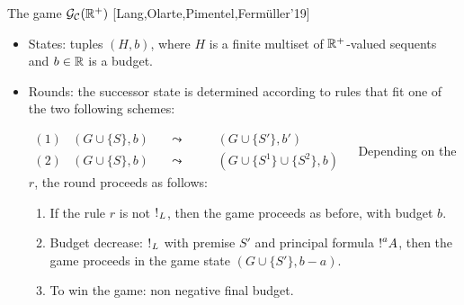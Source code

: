 \documentclass[9pt]{beamer}
\renewcommand{\emph}[1]{{\color{blue} #1}}
\newcommand{\emphdo}[1]{{\color{darkorange} #1}}
\begin{document}
\begin{frame}{The game $\mathcal{G}_{\mathcal{C}}(\mathbb{R}^+)$ [Lang,Olarte,Pimentel,Ferm\"{u}ller'19]}
\begin{itemize}
\item \emph{States}:  tuples $(H,b)$, where $H$ is a finite multiset of $\mathbb{R}^+$-valued sequents and $b\in\mathbb{R}$ is a \emphdo{budget}.
\item \emph{Rounds}:  the successor state is determined according to rules that fit one of the two following schemes:

$
\begin{array}{lllll}
{(1)} &(G\cup\{S\},b)&\quad\leadsto\quad&  \quad (G\cup\{S'\},b') & \\
{(2)} &(G\cup\{S\},b)&\quad\leadsto\quad&  \quad (G\cup\{S^1\}\cup\{S^2\},b)
\end{array}
$
\xitem Depending on the $r$, the round proceeds as follows:
\begin{enumerate}
\item If the rule $r$ is not $\hbox{$\mathop{!}^{}$}_L$, then the game proceeds as before, with budget $b$.
\item \emphdo{Budget decrease:} $\hbox{$\mathop{!}^{}$}_L$ with premise $S'$ and principal formula $\hbox{$\mathop{!}^{a}$}A$, then the game proceeds in the game state $(G\cup\{S'\},b-a)$.
\item \emph{To win the game:} non negative final budget.
\end{enumerate}
\end{itemize}
\end{frame}

\end{document}
